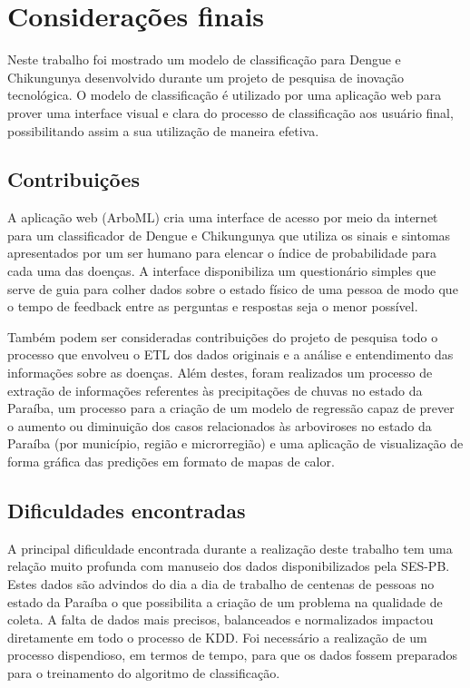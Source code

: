 \chapter{Considerações finais}

Neste trabalho foi mostrado um modelo de classificação para Dengue e Chikungunya desenvolvido durante um projeto de pesquisa de inovação tecnológica. O modelo de classificação é utilizado por uma aplicação web para prover uma interface visual e clara do processo de classificação aos usuário final, possibilitando assim a sua utilização de maneira efetiva.


\section{Contribuições}

A aplicação web (ArboML) cria uma interface de acesso por meio da internet para um classificador de Dengue e Chikungunya que utiliza os sinais e sintomas apresentados por um ser humano para elencar o índice de probabilidade para cada uma das doenças. A interface disponibiliza um questionário simples que serve de guia para colher dados sobre o estado físico de uma pessoa de modo que o tempo de feedback entre as perguntas e respostas seja o menor possível.

Também podem ser consideradas contribuições do projeto de pesquisa todo o processo que envolveu o ETL dos dados originais e a análise e entendimento das informações sobre as doenças. Além destes, foram realizados um processo de extração de informações referentes às precipitações de chuvas no estado da Paraíba, um processo para a criação de um modelo de regressão capaz de prever o aumento ou diminuição dos casos relacionados às arboviroses no estado da Paraíba (por município, região e microrregião) e uma aplicação de visualização de forma gráfica das predições em formato de mapas de calor.

\section{Dificuldades encontradas}

A principal dificuldade encontrada durante a realização deste trabalho tem uma relação muito profunda com manuseio dos dados disponibilizados pela SES-PB. Estes dados são advindos do dia a dia de trabalho de centenas de pessoas no estado da Paraíba o que possibilita a criação de um problema na qualidade de coleta. A falta de dados mais precisos,  balanceados e  normalizados impactou diretamente em todo o processo de KDD. Foi necessário a realização de um processo dispendioso, em termos de tempo, para que os dados fossem preparados para o treinamento do algoritmo de classificação.

